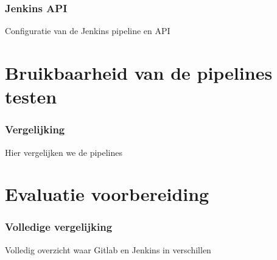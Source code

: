 \section{Jenkins API}
Configuratie van de Jenkins pipeline en API

\part{Bruikbaarheid van de pipelines testen}
\section{Vergelijking}
Hier vergelijken we de pipelines


\part{Evaluatie voorbereiding}
\section{Volledige vergelijking}
Volledig overzicht waar Gitlab en Jenkins in verschillen    